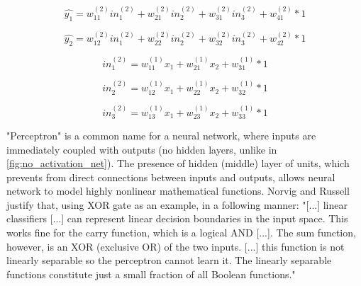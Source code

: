 \documentclass[11pt]{article}
\begin{document}
\begin{equation} \label{eq:y_hat_1}
\hat{y_1} = w_{11}^{(2)}in_1^{(2)} + w_{21}^{(2)}in_2^{(2)} + w_{31}^{(2)}in_3^{(2)} + w_{41}^{(2)} * 1 
\end{equation}

\begin{equation} \label{eq:y_hat_2}
\hat{y_2} = w_{12}^{(2)}in_1^{(2)} + w_{22}^{(2)}in_2^{(2)} + w_{32}^{(2)}in_3^{(2)} + w_{42}^{(2)} * 1 
\end{equation}

\begin{equation} \label{eq:in_1}
in_1^{(2)} = w_{11}^{(1)}x_1 + w_{21}^{(1)}x_2 + w_{31}^{(1)} * 1 
\end{equation}

\begin{equation} \label{eq:in_2}
in_2^{(2)} = w_{12}^{(1)}x_1 + w_{22}^{(1)}x_2 + w_{32}^{(1)} * 1 
\end{equation}

\begin{equation} \label{eq:in_3}
in_3^{(2)} = w_{13}^{(1)}x_1 + w_{23}^{(1)}x_2 + w_{33}^{(1)} * 1 
\end{equation}

"Perceptron" is a common name for a neural network, where inputs are immediately coupled with outputs (no hidden layers, unlike in \autoref{fig:no_activation_net}). The presence of hidden (middle) layer of units, which prevents from direct connections between inputs and outputs, allows neural network to model highly nonlinear mathematical functions. Norvig and Russell justify that, using XOR gate as an example, in a following manner: "[...] linear classifiers [...] can represent linear decision boundaries in the input space. This works fine for the carry function, which is a logical AND [...]. The sum function, however, is an XOR (exclusive OR) of the two inputs. [...] this function is not linearly separable so the perceptron cannot learn it. The linearly separable functions constitute just a small fraction of all Boolean functions." \cite{ai_modern_approach}\\
\end{document}
